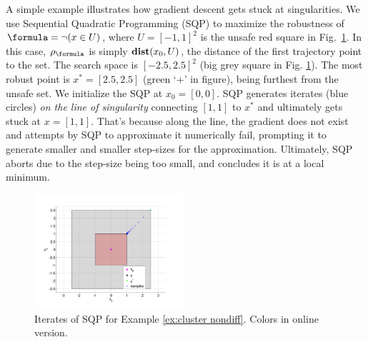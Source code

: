 \begin{exmp}
	\label{ex:cluster nondiff}
	A simple example illustrates how gradient descent gets stuck at singularities.
	We use Sequential Quadratic Programming (SQP) \cite{Polak97_Optim} to maximize the robustness of $\formula = \neg (x \in U)$, where $U=[-1,1]^2$ is the unsafe red square in Fig.~\ref{fig:DumbExample}.
	In this case, $\robf$ is simply $\mathbf{dist}(x_0,U)$, the distance of the first trajectory point to the set.
	The search space is $[-2.5,2.5]^2$ (big grey square in Fig. \ref{fig:DumbExample}). 
	The most robust point is $x^* = [2.5,2.5]$ (green `+' in figure), being furthest from the unsafe set.
	We initialize the SQP at $x_0=[0,0]$. 
	SQP generates iterates (blue circles) \textit{on the line of singularity} connecting $[1,1]$ to $x^*$ and ultimately gets stuck at $x=[1,1]$.
	That's because along the line, the gradient does not exist and attempts by SQP to approximate it numerically fail, prompting it to generate smaller and smaller step-sizes for the approximation.
	Ultimately, SQP aborts due to the step-size being too small, and concludes it is at a local minimum.
\begin{figure}[t]
\centering
\includegraphics[width=0.49\textwidth]{figures/DumbOptEx}
\caption{{\small Iterates of SQP for Example \ref{ex:cluster nondiff}. Colors in online version.}}
\label{fig:DumbExample}
\end{figure}

\end{exmp}
